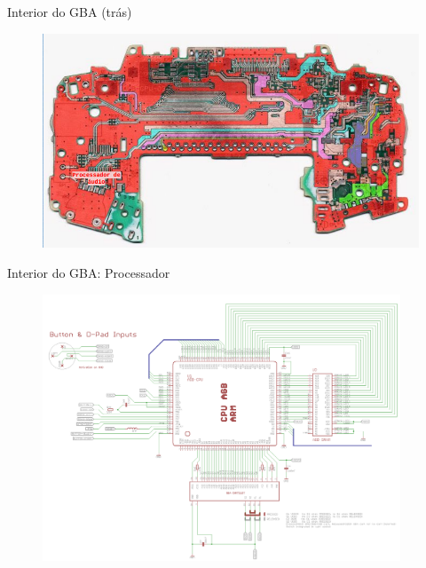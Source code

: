 \documentclass{beamer}
\begin{document}
\begin{darkframes}
\begin{frame}{Interior do GBA (trás)}
    \begin{figure}[h!]
        \centering
        \includegraphics[width=1\textwidth,height=1\textheight,keepaspectratio]{gba_inside_back}
    \end{figure}
\end{frame}

\begin{frame}{Interior do GBA: Processador}
    \begin{figure}[h!]
        \centering
        \includegraphics[width=0.95\textwidth,height=0.95\textheight,keepaspectratio]{gba_processor}
    \end{figure}
\end{frame}


\end{darkframes}
\end{document}
